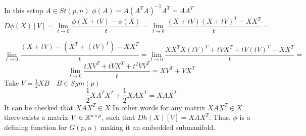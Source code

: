 \documentclass[11pt,a4paper]{report}
\begin{document}
\begin{center}
\end{center}
In this setup $A \in St(p,n)$ $\phi(A) = A(A^T A)^{-1} A^T = A A^T$
$$
D \phi (X) [V] = \lim_{t \to 0} \frac{ \phi( X + tV) - \phi(X) }{t} = 
\lim_{t \to 0} \frac{ (X + tV) (X + tV)^T - XX^T }{t} =
$$

$$
\lim_{t \to 0} \frac{ (X + tV) - (X^T + (tV)^T) - XX^T}{t} = \lim_{t \to 0} \frac{ XX^T X(tV)^T + tVX^T + tV(tV)^T - XX^T}{t} =
$$
$$
\lim_{t \to 0} \frac{ tXV^T + tVX^T + t^2 V V^T}{t} = XV^T + VX^T
$$
Take $V=\frac{1}{2} X B \quad B \in Sym(p)$
$$ \frac{1}{2} X A^T X^T + \frac{1}{2} X A X^T = X A X^T $$
It can be checked that $X A X^T \in X$ In other words for any matrix $X A X^T \in X$ there exists a matrix
$V \in \mathbb{R}^{n \times p}$, such that $Dh(X)[V] = X A X^T$. 
Thus, $\phi$ is a defining function for $G(p,n)$ making it an embedded submanifold.
\end{document}
